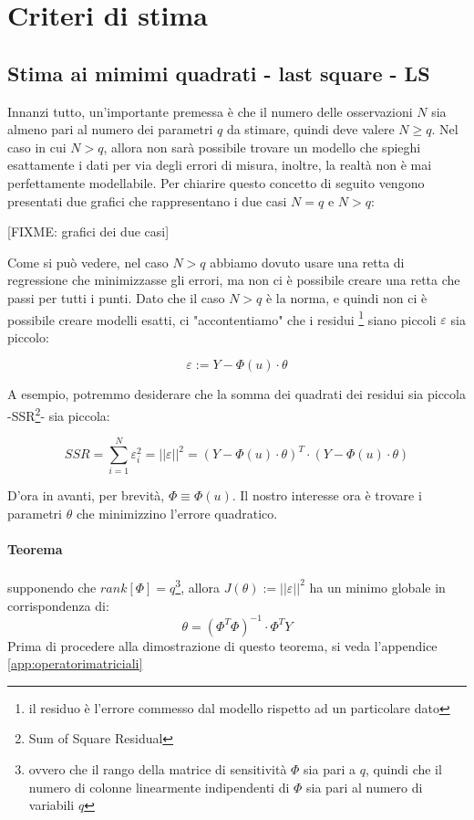 \section{Criteri di stima}
\subsection{Stima ai mimimi quadrati - last square - LS}
Innanzi tutto, un'importante premessa è che il numero delle osservazioni $N$ sia almeno pari al numero dei parametri $q$ da stimare, quindi deve valere $N\geq q$. Nel caso in cui $N>q$, allora non sarà possibile trovare un modello che spieghi esattamente i dati per via degli errori di misura, inoltre, la realtà non è mai perfettamente modellabile. Per chiarire questo concetto di seguito vengono presentati due grafici che rappresentano i due casi $N=q$ e $N>q$:
\begin{center}
[FIXME: grafici dei due casi]
\end{center}
Come si può vedere, nel caso $N>q$ abbiamo dovuto usare una retta di regressione che minimizzasse gli errori, ma non ci è possibile creare una retta che passi per tutti i punti. Dato che il caso $N>q$ è la norma, e quindi non ci è possibile creare modelli esatti, ci "accontentiamo" che i residui \footnote{il residuo è l'errore commesso dal modello rispetto ad un particolare dato} siano piccoli $\varepsilon$ sia piccolo:

  \[ \varepsilon :=Y-\Phi(u)\cdot \theta \]
  
A esempio, potremmo desiderare che la somma dei quadrati dei residui sia piccola -SSR\footnote{Sum of Square Residual}-  sia piccola:

  \[ SSR=\sum_{i=1}^{N}{\varepsilon_i^2 } = {||\varepsilon ||}^2 = (Y-\Phi(u)\cdot \theta)^T \cdot (Y-\Phi(u)\cdot \theta) \]
  
D'ora in avanti, per brevità, $\Phi\equiv \Phi(u)$. Il nostro interesse ora è trovare i parametri $\theta$ che minimizzino l'errore quadratico.
\paragraph{Teorema} supponendo che $rank[\Phi]=q$\footnote{ovvero che il rango della matrice di sensitività $\Phi$ sia pari a $q$, quindi che il numero di colonne linearmente indipendenti di $\Phi$ sia pari al numero di variabili $q$}, allora $ J(\theta):={||\varepsilon ||}^2 $ ha un minimo globale in corrispondenza di:
  \[ \theta=(\Phi^T\Phi)^{-1}\cdot \Phi^TY \]
Prima di procedere alla dimostrazione di questo teorema, si veda l'appendice \ref{app:operatorimatriciali}


